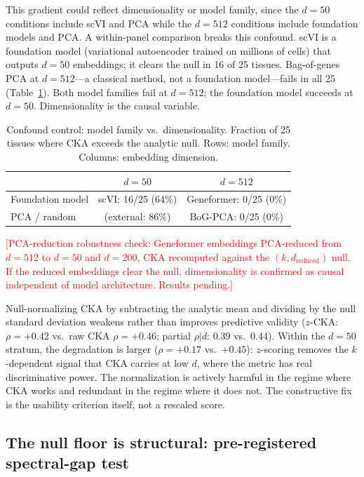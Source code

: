 \documentclass[11pt]{article}
\begin{document}
This gradient could reflect dimensionality or model family, since the
$d = 50$ conditions include scVI and PCA while the $d = 512$ conditions
include foundation models and PCA. A within-panel comparison breaks
this confound. scVI is a foundation model (variational autoencoder
trained on millions of cells) that outputs $d = 50$ embeddings; it
clears the null in 16 of 25 tissues. Bag-of-genes PCA at $d = 512$---a
classical method, not a foundation model---fails in all 25
(Table~\ref{tab:confound}). Both model families fail at $d = 512$; the
foundation model succeeds at $d = 50$. Dimensionality is the causal
variable.

\begin{table}[t]
\centering
\caption{Confound control: model family vs.\ dimensionality. Fraction of
25 tissues where CKA exceeds the analytic null. Rows: model family.
Columns: embedding dimension.}
\label{tab:confound}
\small
\begin{tabular}{@{}lcc@{}}
\toprule
& $d = 50$ & $d = 512$ \\
\midrule
Foundation model & scVI: 16/25 (64\%) & Geneformer: 0/25 (0\%) \\
PCA / random     & (external: 86\%)   & BoG-PCA: 0/25 (0\%) \\
\bottomrule
\end{tabular}
\end{table}

\textcolor{red}{[PCA-reduction robustness check: Geneformer embeddings
PCA-reduced from $d = 512$ to $d = 50$ and $d = 200$, CKA recomputed
against the $(k, d_{\mathrm{reduced}})$ null. If the reduced embeddings
clear the null, dimensionality is confirmed as causal independent of
model architecture. Results pending.]}

Null-normalizing CKA by subtracting the analytic mean and dividing by
the null standard deviation weakens rather than improves predictive
validity ($z$-CKA: $\rho = +0.42$ vs.\ raw CKA $\rho = +0.46$;
partial $\rho|d$: $0.39$ vs.\ $0.44$). Within the $d = 50$ stratum,
the degradation is larger ($\rho = +0.17$ vs.\ $+0.45$): $z$-scoring
removes the $k$-dependent signal that CKA carries at low $d$, where the
metric has real discriminative power. The normalization is actively
harmful in the regime where CKA works and redundant in the regime where
it does not. The constructive fix is the usability criterion itself,
not a rescaled score.


\subsection{The null floor is structural: pre-registered spectral-gap test}
\label{sec:spectral}
\end{document}
